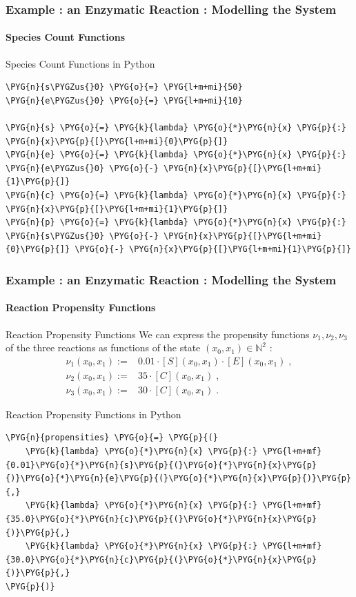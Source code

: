 \documentclass[hyperref={colorlinks=true}]{beamer}
\begin{document}
\begin{frame}[fragile]
\frametitle{Example : an Enzymatic Reaction : Modelling the System}
\framesubtitle{Species Count Functions}
\begin{block}{Species Count Functions in Python}
\begin{Verbatim}[commandchars=\\\{\}]
\PYG{n}{s\PYGZus{}0} \PYG{o}{=} \PYG{l+m+mi}{50}
\PYG{n}{e\PYGZus{}0} \PYG{o}{=} \PYG{l+m+mi}{10}

\PYG{n}{s} \PYG{o}{=} \PYG{k}{lambda} \PYG{o}{*}\PYG{n}{x} \PYG{p}{:} \PYG{n}{x}\PYG{p}{[}\PYG{l+m+mi}{0}\PYG{p}{]}
\PYG{n}{e} \PYG{o}{=} \PYG{k}{lambda} \PYG{o}{*}\PYG{n}{x} \PYG{p}{:} \PYG{n}{e\PYGZus{}0} \PYG{o}{-} \PYG{n}{x}\PYG{p}{[}\PYG{l+m+mi}{1}\PYG{p}{]}
\PYG{n}{c} \PYG{o}{=} \PYG{k}{lambda} \PYG{o}{*}\PYG{n}{x} \PYG{p}{:} \PYG{n}{x}\PYG{p}{[}\PYG{l+m+mi}{1}\PYG{p}{]}
\PYG{n}{p} \PYG{o}{=} \PYG{k}{lambda} \PYG{o}{*}\PYG{n}{x} \PYG{p}{:} \PYG{n}{s\PYGZus{}0} \PYG{o}{-} \PYG{n}{x}\PYG{p}{[}\PYG{l+m+mi}{0}\PYG{p}{]} \PYG{o}{-} \PYG{n}{x}\PYG{p}{[}\PYG{l+m+mi}{1}\PYG{p}{]}
\end{Verbatim}
\end{block}
\end{frame}

\begin{frame}[fragile]
\frametitle{Example : an Enzymatic Reaction : Modelling the System}
\framesubtitle{Reaction Propensity Functions}
\begin{block}{Reaction Propensity Functions}
We can express the propensity functions $\nu_1, \nu_2, \nu_3$ of the
three reactions as functions of the state $(x_0, x_1) \in \mathbb{N}^2$ :
\begin{align*}
\nu_1(x_0, x_1) := & 0.01 \cdot [S](x_0, x_1) \cdot [E](x_0, x_1) \; , \\
\nu_2(x_0, x_1) := & 35 \cdot [C](x_0, x_1) \; ,\\
\nu_3(x_0, x_1) := & 30 \cdot [C](x_0, x_1) \; .
\end{align*}
\end{block}
\begin{block}{Reaction Propensity Functions in Python}
\begin{Verbatim}[commandchars=\\\{\}]
\PYG{n}{propensities} \PYG{o}{=} \PYG{p}{(}
    \PYG{k}{lambda} \PYG{o}{*}\PYG{n}{x} \PYG{p}{:} \PYG{l+m+mf}{0.01}\PYG{o}{*}\PYG{n}{s}\PYG{p}{(}\PYG{o}{*}\PYG{n}{x}\PYG{p}{)}\PYG{o}{*}\PYG{n}{e}\PYG{p}{(}\PYG{o}{*}\PYG{n}{x}\PYG{p}{)}\PYG{p}{,}
    \PYG{k}{lambda} \PYG{o}{*}\PYG{n}{x} \PYG{p}{:} \PYG{l+m+mf}{35.0}\PYG{o}{*}\PYG{n}{c}\PYG{p}{(}\PYG{o}{*}\PYG{n}{x}\PYG{p}{)}\PYG{p}{,}
    \PYG{k}{lambda} \PYG{o}{*}\PYG{n}{x} \PYG{p}{:} \PYG{l+m+mf}{30.0}\PYG{o}{*}\PYG{n}{c}\PYG{p}{(}\PYG{o}{*}\PYG{n}{x}\PYG{p}{)}\PYG{p}{,}
\PYG{p}{)}
\end{Verbatim}
\end{block}
\end{frame}
\end{document}

